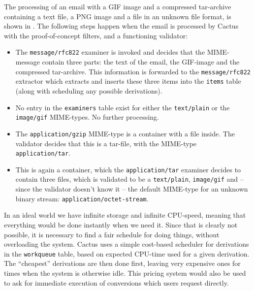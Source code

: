 The processing of an email with a GIF image and a compressed
tar-archive containing a text file, a PNG image and a file in an
unknown file format, is shown in .  The
following steps happen when the email is processed by Cactus with the
proof-of-concept filters, and a functioning validator:

\begin{itemize}
\item The \texttt{message/rfc822} examiner is invoked and decides that
the MIME-message contain three parts: the text of the email, the
GIF-image and the compressed tar-archive.  This information is
forwarded to the \texttt{message/rfc822} extractor which extracts and
inserts these three items into the \texttt{items} table (along with
scheduling any possible derivations).

\item No entry in the \texttt{examiners} table exist for either the
\texttt{text/plain} or the \texttt{image/gif} MIME-types.  No further
processing.

\item The \texttt{application/gzip} MIME-type is a container with a
file inside.  The validator decides that this is a tar-file, with the
MIME-type \texttt{application/tar}.

\item This is again a container, which the \texttt{application/tar}
examiner decides to contain three files, which is validated to be a
\texttt{text/plain}, \texttt{image/gif} and -- since the validator
doesn't know it -- the default MIME-type for an unknown binary stream:
\texttt{application/octet-stream}.
\end{itemize}



In an ideal world we have infinite storage and infinite CPU-speed,
meaning that everything would be done instantly when we need it.
Since that is clearly not possible, it is necessary to find a fair
schedule for doing things, without overloading the system.  Cactus
uses a simple cost-based scheduler for derivations in the
\texttt{workqueue} table, based on expected CPU-time used for a given
derivation.  The ``cheapest'' derivations are then done first, leaving
very expensive ones for times when the system is otherwise idle.  This
pricing system would also be used to ask for immediate execution of
conversions which users request directly.


